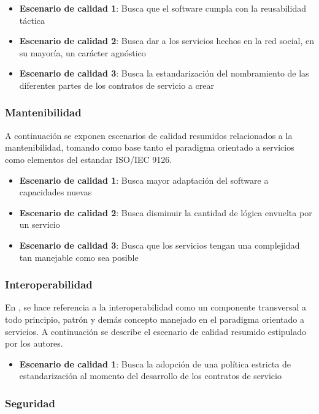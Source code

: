\begin{itemize}
	\item \textbf{Escenario de calidad 1}: Busca que el software cumpla con la reusabilidad táctica
	\item \textbf{Escenario de calidad 2}: Busca dar a los servicios hechos en la red social, en su mayoría, un carácter agnóstico
	\item \textbf{Escenario de calidad 3}: Busca la estandarización del nombramiento de las diferentes partes de los contratos de servicio a crear
\end{itemize}

\subsubsection{Mantenibilidad}

A continuación se exponen escenarios de calidad resumidos relacionados a la mantenibilidad, tomando como base tanto el paradigma orientado a servicios como elementos del estandar ISO/IEC 9126.

\begin{itemize}
	\item \textbf{Escenario de calidad 1}: Busca mayor adaptación del software a capacidades nuevas
	\item \textbf{Escenario de calidad 2}: Busca disminuir la cantidad de lógica envuelta por un servicio
	\item \textbf{Escenario de calidad 3}: Busca que los servicios tengan una complejidad tan manejable como sea posible
\end{itemize}

\subsubsection{Interoperabilidad}

En \cite{soa_principles}, se hace referencia a la interoperabilidad como un componente transversal a todo principio, patrón y demás concepto manejado en el paradigma orientado a servicios. A continuación se describe el escenario de calidad resumido estipulado por los autores.

\begin{itemize}
	\item \textbf{Escenario de calidad 1}: Busca la adopción de una política estricta de estandarización al momento del desarrollo de los contratos de servicio
\end{itemize}

\subsubsection{Seguridad}

